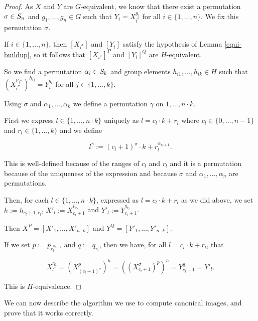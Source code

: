 \begin{proof}
As \(X\) and \(Y\) are \(G\)-equivalent, we know that there exist a permutation
$\sigma \in S_{n}$ and $g_1,\dots,g_n \in G$ such that $Y_i=X_{i^\sigma}^{g_i}$ for all $i \in
\{1,\dots,n\}$. We fix this permutation $\sigma$.

If \(i \in \{1,\dots,n\}\), then \([X_{i^\sigma}]\) and \([Y_i]\) satisfy the
hypothesis of Lemma \ref{equi-buildup}, so it follows that \([X_{i^\sigma}]^P\)
and \([Y_i]^Q\) are $H$-equivalent.

So we find a permutation \(\alpha_i \in S_{k}\) and group elements
\(h_{i1},\dots,h_{ik} \in H\) such that \(
(X_{i^\sigma}^{p_{j^{\alpha_i}}})^{h_{ij}} = Y_i^{q_i}\) for all $j \in
\{1,\dots,k\}$.

Using \(\sigma\) and $\alpha_1,\dots,\alpha_k$ we define a permutation \(\gamma\)
on \(1,\dots,n \cdot k\).

First we express $l \in \{1,\dots,n \cdot k\}$ uniquely as $l=c_l \cdot k+r_l$ where
$c_l \in \{0,\dots,n-1\}$ and $r_l \in \{1,\dots,k\}$ and we define

\[
  l^\gamma:=(c_l+1)^\sigma \cdot k + r_l^{\alpha_{c_l+1}}.
\]

This is well-defined because of the ranges of $c_l$ and $r_l$ and it is a
permutation because of the uniqueness of the expression and because $\sigma$ and
$\alpha_1,\dots,\alpha_n$ are permutations.

Then, for each $l \in \{1,\dots,n \cdot k\}$, expressed as $l=c_l \cdot k+r_l$ as we did
above, we set $h:=h_{c_l+1,r_l}$, $X'_l:=X_{c_l+1}^{p_{r_l}}$ and
$Y'_l:=Y_{c_l+1}^{q_{r_l}}$.

Then $X^P=[X'_1,\dots,X'_{n \cdot k}]$ and $Y^Q=[Y'_1,\dots,Y'_{n \cdot k}]$.

If we set $p:=p_{r_l^{a_{c_l+1}}}$ and $q:=q_{r_l}$, then
we have, for all $l=c_l \cdot k+r_l$, that

\[
  X_{l^{\gamma}}^{\prime h} = (X_{(c_l+1)^\sigma}^{p})^{h} =
  ((X_{c_l+1}^\sigma)^{p})^{h} = Y_{c_l+1}^{q} = Y'_l.
\]

This is $H$-equivalence.
\end{proof}

We can now describe the algorithm we use to compute canonical images,
and prove that it works correctly.

